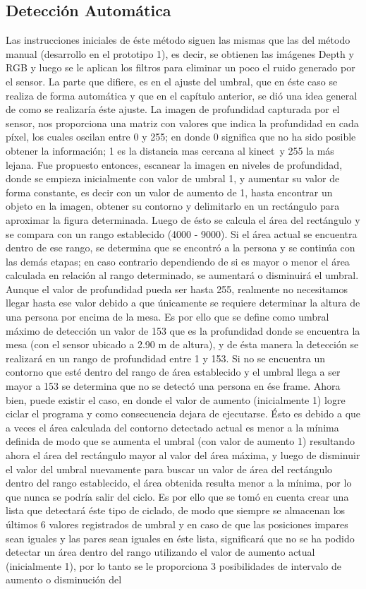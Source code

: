 \documentclass[a4paper,openright,12pt]{report}
\begin{document}
\subsection{Detección Automática}
Las instrucciones iniciales de éste método siguen las mismas que las del método manual (desarrollo en el prototipo 1), es decir, se obtienen las imágenes Depth y RGB y luego se le aplican los filtros para eliminar un poco el ruido generado por el sensor. La parte que difiere, es en el ajuste del umbral, que en éste caso se realiza de forma automática y que en el capítulo anterior, se dió una idea general de como se realizaría éste ajuste. La imagen de profundidad capturada por el sensor, nos proporciona una matriz con valores que indica la profundidad en cada píxel, los cuales oscilan entre 0 y 255; en donde 0 significa que no ha sido posible obtener la información; 1 es la distancia mas cercana al kinect\textcopyright\ y 255 la más lejana. Fue propuesto entonces, escanear la imagen en niveles de profundidad, donde se empieza inicialmente con valor de umbral 1, y aumentar su valor de forma constante, es decir con un valor de aumento de 1, hasta encontrar un objeto en la imagen, obtener su contorno y delimitarlo en un rectángulo para aproximar la figura determinada. Luego de ésto se calcula el área del rectángulo y se compara con un rango establecido (4000 - 9000). Si el área actual se encuentra dentro de ese rango, se determina que se encontró a la persona y se continúa con las demás etapas; en caso contrario dependiendo de si es mayor o menor el área calculada en relación al rango determinado, se aumentará o disminuirá el umbral. Aunque el valor de profundidad pueda ser hasta 255, realmente no necesitamos llegar hasta ese valor debido a que únicamente se requiere determinar la altura de una persona por encima de la mesa. Es por ello que se define como umbral máximo de detección un valor de 153 que es la profundidad donde se encuentra la mesa (con el sensor ubicado a 2.90 m de altura), y de ésta manera la detección se realizará en un rango de profundidad entre 1 y 153. Si no se encuentra un contorno que esté dentro del rango de área establecido y el umbral llega a ser mayor a 153 se determina que no se detectó una persona en ése frame. Ahora bien, puede existir el caso, en donde el valor de aumento (inicialmente 1) logre ciclar el programa y como consecuencia dejara de ejecutarse. Ésto es debido a que a veces el área calculada del contorno detectado actual es menor a la mínima definida de modo que se aumenta el umbral (con valor de aumento 1) resultando ahora el área del rectángulo mayor al valor del área máxima, y luego de disminuir el valor del umbral nuevamente para buscar un valor de área del rectángulo dentro del rango establecido, el área obtenida resulta menor a la mínima, por lo que nunca se podría salir del ciclo. Es por ello que se tomó en cuenta crear una lista que detectará éste tipo de ciclado, de modo que siempre se almacenan los últimos 6 valores registrados de umbral y en caso de que las posiciones impares sean iguales y las pares sean iguales en éste lista, significará que no se ha podido detectar un área dentro del rango utilizando el valor de aumento actual (inicialmente 1), por lo tanto se le proporciona 3 posibilidades de intervalo de aumento o disminución del 
\end{document}

